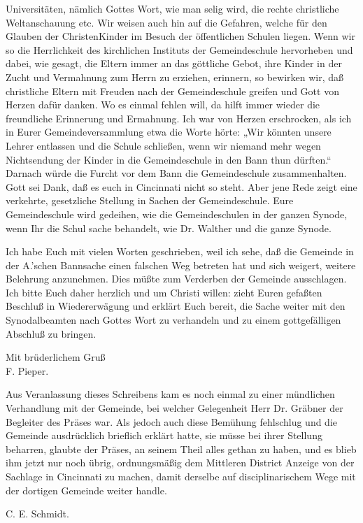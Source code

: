 Universitäten, nämlich Gottes Wort, wie man selig wird, die rechte christliche Weltanschauung etc. Wir weisen auch hin auf die Gefahren, welche für den Glauben der ChristenKinder im Besuch der öffentlichen Schulen liegen. Wenn wir so die Herrlichkeit des kirchlichen Instituts der Gemeindeschule hervorheben und dabei, wie gesagt, die Eltern immer an das göttliche Gebot, ihre Kinder in der Zucht und Vermahnung zum Herrn zu erziehen, erinnern, so bewirken wir, daß christliche Eltern mit Freuden nach der Gemeindeschule greifen und Gott von Herzen dafür danken. Wo es einmal fehlen will, da hilft immer wieder die freundliche Erinnerung und Ermahnung. Ich war von Herzen erschrocken, als ich in Eurer Gemeindeversammlung etwa die Worte hörte: „Wir könnten unsere Lehrer entlassen und die Schule schließen, wenn wir niemand mehr wegen Nichtsendung der Kinder in die Gemeindeschule in den Bann thun dürften.“ Darnach würde die Furcht vor dem Bann die Gemeindeschule zusammenhalten. Gott sei Dank, daß es euch in Cincinnati nicht so steht. Aber jene Rede zeigt eine verkehrte, gesetzliche Stellung in Sachen der Gemeindeschule. Eure Gemeindeschule wird gedeihen, wie die Gemeindeschulen in der ganzen Synode, wenn Ihr die Schul sache behandelt, wie Dr. Walther und die ganze Synode.

Ich habe Euch mit vielen Worten geschrieben, weil ich sehe, daß die Gemeinde in der A.’schen Bannsache einen falschen Weg betreten hat und sich weigert, weitere Belehrung anzunehmen. Dies müßte zum
Verderben der Gemeinde ausschlagen. Ich bitte Euch daher herzlich und um Christi willen: zieht Euren gefaßten Beschluß in Wiedererwägung und erklärt Euch bereit, die Sache weiter mit den Synodalbeamten nach Gottes Wort zu verhandeln und zu einem gottgefälligen Abschluß zu bringen.

\begin{unterschrift}
Mit brüderlichem Gruß\\
F. Pieper.
\end{unterschrift}

Aus Veranlassung dieses Schreibens kam es noch einmal zu einer mündlichen Verhandlung mit der Gemeinde, bei welcher Gelegenheit Herr Dr. Gräbner der Begleiter des Präses war. Als jedoch auch diese Bemühung fehlschlug und die Gemeinde ausdrücklich brieflich erklärt hatte, sie müsse bei ihrer Stellung beharren, glaubte der Präses, an seinem Theil alles gethan zu haben, und es blieb ihm jetzt nur noch übrig, ordnungsmäßig dem Mittleren District Anzeige von der Sachlage in Cincinnati zu machen, damit derselbe auf disciplinarischem Wege mit der dortigen Gemeinde weiter handle.

\begin{unterschrift}
C. E. Schmidt.
\end{unterschrift}
